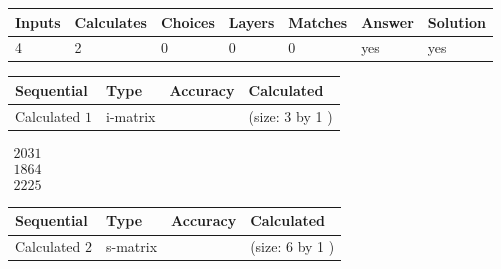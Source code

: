 \documentclass[12pt]{article}
\begin{document}
 
 
\noindent{}
 
 

 
 
 
\noindent{}
 
 

 
 
\noindent{}
 
 

 
\vspace{0.3in}
   
   
   
   
\noindent\begin{tabular}{|l|l|l|l|l|l|l|}
 \hline
Inputs & Calculates & Choices & Layers & Matches & Answer & Solution \\ \hline
           4  & 
           2  & 
           0
  & 
           0  & 
           0  & 
  yes & 
  yes 
  \\ \hline
 \end{tabular}
   
   
   
   
\noindent{}
   
   
  
  
\noindent\begin{tabular}{|l|l|l|l|}
\hline
 Sequential & Type & Accuracy & Calculated \\ 
\hline
 
 
  Calculated $            1 $ & i-matrix &  & 
 (size:            3  by            1 )
 \\  \hline  
 \end{tabular}
   
   
$\begin{array}{
 c
 }
        2031  \\ 
        1864  \\ 
        2225
 \end{array}  $ 
  
  
\noindent\begin{tabular}{|l|l|l|l|}
\hline
 Sequential & Type & Accuracy & Calculated \\ 
\hline
 
 
  Calculated $            2 $ & s-matrix & & 
 (size:            6  by            1 )
 \\  \hline  
 \end{tabular}
   
\end{document}
